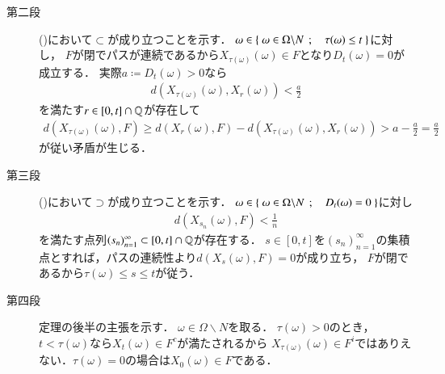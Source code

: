 \begin{prf}
\begin{description}
			\item[第二段]
				()において$\subset$が成り立つことを示す．
				$\omega \in \left\{\ \omega \in \Omega \backslash N\ \, ; \quad \tau(\omega) \leq t\ \right\}$に対し，
				$F$が閉でパスが連続であるから$X_{\tau(\omega)}(\omega) \in F$となり$D_t(\omega) = 0$が成立する．
				実際$a \coloneqq D_t(\omega) > 0$なら
				\begin{align}
					d(X_{\tau(\omega)}(\omega), X_r(\omega)) < \frac{a}{2}
				\end{align}
				を満たす$r \in [0,t] \cap \mathbb{Q}$が存在して
				\begin{align}
					d(X_{\tau(\omega)}(\omega),F) \geq d(X_r(\omega),F) - d(X_{\tau(\omega)}(\omega), X_r(\omega)) > a - \frac{a}{2} = \frac{a}{2}
				\end{align}
				が従い矛盾が生じる．
			
			\item[第三段]
				()において$\supset$が成り立つことを示す．
				$\omega \in \left\{\ \omega \in \Omega \backslash N\ \, ; \quad D_t(\omega) = 0\ \right\}$に対し
				\begin{align}
					d(X_{s_n}(\omega),F) < \frac{1}{n}
				\end{align}
				を満たす点列$(s_n)_{n=1}^{\infty} \subset [0,t] \cap \mathbb{Q}$が存在する．
				$s \in [0,t]$を$(s_n)_{n=1}^{\infty}$の集積点とすれば，パスの連続性より$d(X_s(\omega),F) = 0$が成り立ち，
				$F$が閉であるから$\tau(\omega) \leq s \leq t$が従う．
				
			\item[第四段]
				定理の後半の主張を示す．
				$\omega \in \Omega \backslash N$を取る．
				$\tau(\omega) > 0$のとき，$t < \tau(\omega)$なら$X_t(\omega) \in F^c$が満たされるから
				$X_{\tau(\omega)}(\omega) \in F^i$ではありえない．$\tau(\omega) = 0$の場合は$X_0(\omega) \in F$である．
				\QED
		\end{description}
	\end{prf}
	